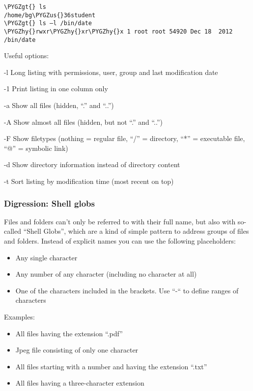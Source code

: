 \documentclass[a4paper,11pt,english]{sphinxmanual}
\def\PYGZus{\char`\_}
\def\PYGZgt{\char`\>}
\def\PYGZhy{\char`\-}
\begin{document}
\begin{Verbatim}[frame=single, rulecolor=\color{lightgray}, fontfamily=courier, commandchars=\\\{\}]
\PYGZgt{} ls
/home/bg\PYGZus{}36student
\PYGZgt{} ls –l /bin/date
\PYGZhy{}rwxr\PYGZhy{}xr\PYGZhy{}x 1 root root 54920 Dec 18  2012 /bin/date
\end{Verbatim}

Useful options:
\begin{optionlist}{3cm}
\item [-l]  
Long listing with permissions, user, group and last modification date
\item [-1]  
Print listing in one column only
\item [-a]  
Show all files (hidden, “.” and “..”)
\item [-A]  
Show almost all files (hidden, but not “.” and “..”)
\item [-F]  
Show filetypes (nothing = regular file, “/” = directory, “*” = executable file, “@” = symbolic link)
\item [-d]  
Show directory information instead of  directory content
\item [-t]  
Sort listing by modification time (most recent on top)
\end{optionlist}


\subsubsection{Digression: Shell globs}
\label{introduction:digression-shell-globs}
Files and folders can’t only be referred to with their full name, but also with so-called “Shell Globs”, which are a kind of simple pattern to address groups of files and folders.  Instead of explicit names you can use the following placeholders:
\begin{itemize}
\item {} 
  Any single character

\item {} 
\code{*:}  Any number of any character (including no character at all)

\item {} 
\code{{[}...{]}:}    One of the characters included in the brackets.  Use “-“ to define ranges  of characters

\end{itemize}

Examples:
\begin{itemize}
\item {} 
  All files having the extension “.pdf”

\item {} 
  Jpeg file consisting of only one character

\item {} 
 All files starting with a number and having the extension “.txt”

\item {} 
  All files having a three-character extension

\end{itemize}
\end{document}

